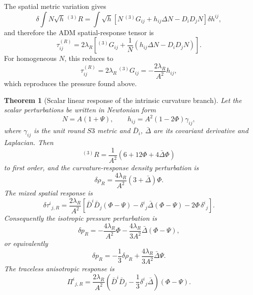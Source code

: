 \documentclass[11pt,a4paper]{article}
\def\Sthree{S3}%
\numberwithin{equation}{section}
\theoremstyle{definition}
\theoremstyle{plain}
\newtheorem{theorem}[criterion]{Theorem}
\theoremstyle{remark}
\newcommand{\Sthree}{S^3}
\begin{document}
The spatial metric variation gives
\begin{equation}
\delta\!\int N\sqrt h\,{}^{(3)}R
=
\int\sqrt h
\left[
N\,{}^{(3)}G_{ij}
+h_{ij}\Delta N
-D_iD_jN
\right]\delta h^{ij},
\end{equation}
and therefore the ADM spatial-response tensor is
\begin{equation}
\boxed{
\tau^{(R)}_{ij}
=
2\lambda_R
\left[
{}^{(3)}G_{ij}
+\frac{1}{N}
\left(
h_{ij}\Delta N-D_iD_jN
\right)
\right].
}
\end{equation}
For homogeneous \(N\), this reduces to
\begin{equation}
\tau^{(R)}_{ij}
=
2\lambda_R\,{}^{(3)}G_{ij}
=-\frac{2\lambda_R}{A^2}h_{ij},
\end{equation}
which reproduces the pressure found above.

\begin{theorem}[Scalar linear response of the intrinsic curvature branch]
Let the scalar perturbations be written in Newtonian form
\begin{equation}
N=A(1+\Psi),
\qquad
h_{ij}=A^2(1-2\Phi)\gamma_{ij},
\end{equation}
where \(\gamma_{ij}\) is the unit round \(\Sthree\) metric and
\(\bar D_i\), \(\bar\Delta\) are its covariant derivative and Laplacian. Then
\begin{equation}
{}^{(3)}R
=
\frac{1}{A^2}
\left(
6+12\Phi+4\bar\Delta\Phi
\right)
\end{equation}
to first order, and the curvature-response density perturbation is
\begin{equation}
\boxed{
\delta\rho_R
=
\frac{4\lambda_R}{A^2}
\left(3+\bar\Delta\right)\Phi .
}
\end{equation}
The mixed spatial response is
\begin{equation}
\boxed{
\delta\tau^{i}{}_{j,R}
=
\frac{2\lambda_R}{A^2}
\left[
\bar D^i\bar D_j(\Phi-\Psi)
-\delta^i{}_j\bar\Delta(\Phi-\Psi)
-2\Phi\,\delta^i{}_j
\right].
}
\end{equation}
Consequently the isotropic pressure perturbation is
\begin{equation}
\boxed{
\delta p_R
=
-\frac{4\lambda_R}{A^2}\Phi
-\frac{4\lambda_R}{3A^2}\bar\Delta(\Phi-\Psi),
}
\end{equation}
or equivalently
\begin{equation}
\boxed{
\delta p_R
=
-\frac13\delta\rho_R
+\frac{4\lambda_R}{3A^2}\bar\Delta\Psi .
}
\end{equation}
The traceless anisotropic response is
\begin{equation}
\boxed{
\Pi^{i}{}_{j,R}
=
\frac{2\lambda_R}{A^2}
\left(
\bar D^i\bar D_j
-\frac13\delta^i{}_j\bar\Delta
\right)(\Phi-\Psi).
}
\end{equation}
\end{theorem}
\end{document}
